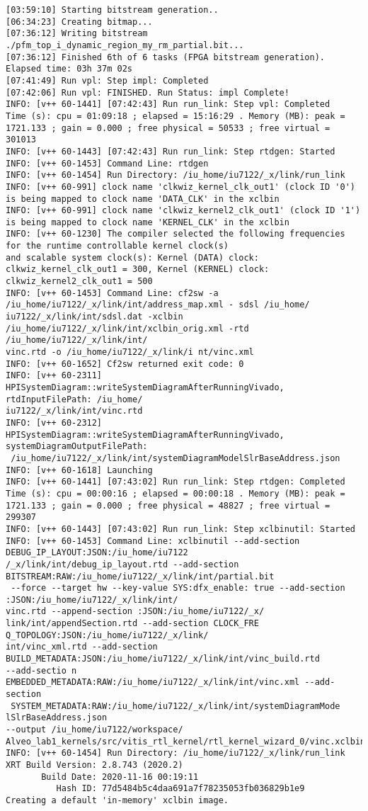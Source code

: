 \begin{lstlisting}[label=some-code-2,caption=Содержимое файла v++\_vinc.log]
[03:59:10] Starting bitstream generation..
[06:34:23] Creating bitmap...
[07:36:12] Writing bitstream ./pfm_top_i_dynamic_region_my_rm_partial.bit...
[07:36:12] Finished 6th of 6 tasks (FPGA bitstream generation). Elapsed time: 03h 37m 02s 
[07:41:49] Run vpl: Step impl: Completed
[07:42:06] Run vpl: FINISHED. Run Status: impl Complete!
INFO: [v++ 60-1441] [07:42:43] Run run_link: Step vpl: Completed
Time (s): cpu = 01:09:18 ; elapsed = 15:16:29 . Memory (MB): peak = 1721.133 ; gain = 0.000 ; free physical = 50533 ; free virtual = 301013
INFO: [v++ 60-1443] [07:42:43] Run run_link: Step rtdgen: Started
INFO: [v++ 60-1453] Command Line: rtdgen
INFO: [v++ 60-1454] Run Directory: /iu_home/iu7122/_x/link/run_link
INFO: [v++ 60-991] clock name 'clkwiz_kernel_clk_out1' (clock ID '0') is being mapped to clock name 'DATA_CLK' in the xclbin
INFO: [v++ 60-991] clock name 'clkwiz_kernel2_clk_out1' (clock ID '1') is being mapped to clock name 'KERNEL_CLK' in the xclbin
INFO: [v++ 60-1230] The compiler selected the following frequencies for the runtime controllable kernel clock(s) 
and scalable system clock(s): Kernel (DATA) clock: clkwiz_kernel_clk_out1 = 300, Kernel (KERNEL) clock: clkwiz_kernel2_clk_out1 = 500
INFO: [v++ 60-1453] Command Line: cf2sw -a /iu_home/iu7122/_x/link/int/address_map.xml - sdsl /iu_home/
iu7122/_x/link/int/sdsl.dat -xclbin /iu_home/iu7122/_x/link/int/xclbin_orig.xml -rtd /iu_home/iu7122/_x/link/int/
vinc.rtd -o /iu_home/iu7122/_x/link/i nt/vinc.xml
INFO: [v++ 60-1652] Cf2sw returned exit code: 0 
INFO: [v++ 60-2311] HPISystemDiagram::writeSystemDiagramAfterRunningVivado, rtdInputFilePath: /iu_home/
iu7122/_x/link/int/vinc.rtd
INFO: [v++ 60-2312] HPISystemDiagram::writeSystemDiagramAfterRunningVivado, systemDiagramOutputFilePath:
 /iu_home/iu7122/_x/link/int/systemDiagramModelSlrBaseAddress.json
INFO: [v++ 60-1618] Launching 
INFO: [v++ 60-1441] [07:43:02] Run run_link: Step rtdgen: Completed
Time (s): cpu = 00:00:16 ; elapsed = 00:00:18 . Memory (MB): peak = 1721.133 ; gain = 0.000 ; free physical = 48827 ; free virtual = 299307
INFO: [v++ 60-1443] [07:43:02] Run run_link: Step xclbinutil: Started
INFO: [v++ 60-1453] Command Line: xclbinutil --add-section DEBUG_IP_LAYOUT:JSON:/iu_home/iu7122 
/_x/link/int/debug_ip_layout.rtd --add-section BITSTREAM:RAW:/iu_home/iu7122/_x/link/int/partial.bit
 --force --target hw --key-value SYS:dfx_enable: true --add-section :JSON:/iu_home/iu7122/_x/link/int/
vinc.rtd --append-section :JSON:/iu_home/iu7122/_x/
link/int/appendSection.rtd --add-section CLOCK_FRE Q_TOPOLOGY:JSON:/iu_home/iu7122/_x/link/
int/vinc_xml.rtd --add-section BUILD_METADATA:JSON:/iu_home/iu7122/_x/link/int/vinc_build.rtd 
--add-sectio n EMBEDDED_METADATA:RAW:/iu_home/iu7122/_x/link/int/vinc.xml --add-section
 SYSTEM_METADATA:RAW:/iu_home/iu7122/_x/link/int/systemDiagramMode lSlrBaseAddress.json 
--output /iu_home/iu7122/workspace/
Alveo_lab1_kernels/src/vitis_rtl_kernel/rtl_kernel_wizard_0/vinc.xclbin 
INFO: [v++ 60-1454] Run Directory: /iu_home/iu7122/_x/link/run_link
XRT Build Version: 2.8.743 (2020.2)
       Build Date: 2020-11-16 00:19:11
          Hash ID: 77d5484b5c4daa691a7f78235053fb036829b1e9
Creating a default 'in-memory' xclbin image.


\end{lstlisting}
